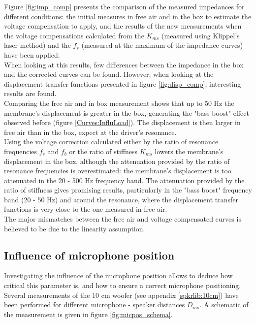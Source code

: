 \documentclass{report}
\begin{document}
Figure \ref{fig:imp_comp} presents the comparison of the measured impedances for different conditions: the initial measures in free air and in the box to estimate the voltage compensation to apply, and the results of the new measurements when the voltage compensations calculated from the $K_{ms}$ (measured using Klippel's laser method) and the $f_{s}$ (measured at the maximum of the impedance curves) have been applied. \\
When looking at this results, few differences between the impedance in the box and the corrected curves can be found. However, when looking at the displacement transfer functions presented in figure \ref{fig:disp_comp}, interesting results are found. \\

Comparing the free air and in box measurement shows that up to 50 Hz the membrane's displacement is greater in the box, generating the "bass boost" effect observed before (figure \ref{Curves:InfluLoad}). The displacement is then larger in free air than in the box, expect at the driver's resonance.\\
Using the voltage correction calculated either by the ratio of resonance frequencies $f_{s}$ and $f_{b}$ or the ratio of stiffness $K_{ms}$ lowers the membrane's displacement in the box, although the attenuation provided by the ratio of resonance frequencies is overestimated: the membrane's displacement is too attenuated in the 20 - 500 Hz frequency band. The attenuation provided by the ratio of stiffness gives promising results, particularly in the "bass boost" frequency band (20 - 50 Hz) and around the resonance, where the displacement transfer functions is very close to the one measured in free air. \\

The major mismatches between the free air and voltage compensated curves is believed to be due to the linearity assumption. 

\subsection{Influence of microphone position}

Investigating the influence of the microphone position allows to deduce how critical this parameter is, and how to ensure a correct microphone positioning. Several measurements of the 10 cm woofer (see appendix \ref{spkrlib:10cm}) have been performed for different microphone - speaker distances $D_{ms}$. A schematic of the measurement is given in figure \ref{fig:micpos_schema}.  \\
\end{document}
